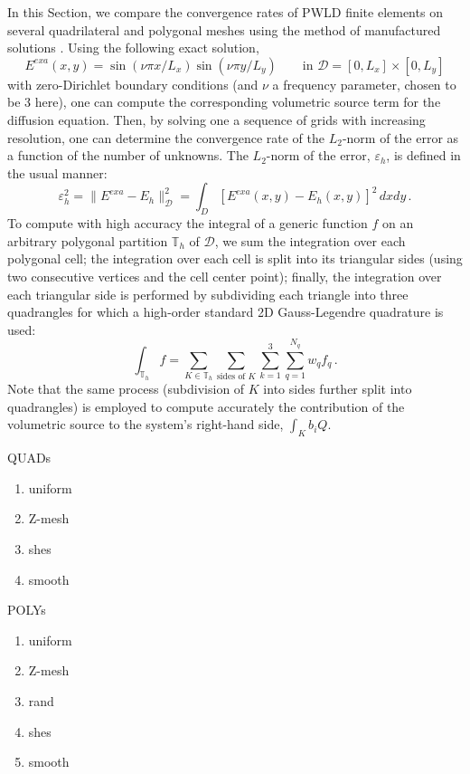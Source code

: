 \documentclass[preprint,10pt]{elsarticle}
\newcommand{\D}{\mathcal{D}}
\newcommand{\tf}{b}
\begin{document}
In this Section, we compare the convergence rates of PWLD finite elements on several quadrilateral
and polygonal meshes using the method of manufactured solutions \cite{mms}. Using the following exact solution,
\begin{equation}
	E^{\textit{exa}}(x,y) = \sin(\nu \pi x/L_x) \sin(\nu\pi y/L_y) \qquad \text{in } \D=[0,L_x]\times [0,L_y]
\end{equation}
with zero-Dirichlet boundary conditions (and $\nu$ a frequency parameter, chosen to be 3 here), one can compute 
the corresponding volumetric source term for the diffusion equation. Then, by solving one a sequence of
grids with increasing resolution, one can determine the convergence rate of the $L_2$-norm of the error
as a function of the number of unknowns. The $L_2$-norm of the error, $\varepsilon_h$, is defined in the usual manner:
\begin{equation}
	\varepsilon_h^2 = \| E^{\textit{exa}} - E_h \|^2_\D = \int_D \left[ E^{\textit{exa}}(x,y)  - E_h(x,y) \right]^2 \, dxdy	\, .
\end{equation}
To compute with high accuracy the integral of a generic function $f$ on an arbitrary polygonal partition $\mathbb{T}_h$ of $\D$, we sum the integration over each polygonal cell; the integration over each cell is split into its triangular sides (using two consecutive vertices and the cell center point); finally, the integration over each triangular side is performed by subdividing each triangle into three quadrangles for which a high-order standard 2D Gauss-Legendre quadrature is used:
\begin{equation}
	\int_{\mathbb{T}_h} f  = \sum_{K\in \mathbb{T}_h} \sum_{\text{sides of }K} \sum_{k=1}^3 
	\sum_{q=1}^{N_q} w_q f_q
	\, .
\end{equation}
Note that the same process (subdivision of $K$ into sides further split into quadrangles) is employed to compute accurately the contribution of the volumetric source to the system's right-hand side, $\int_K \tf_i Q$.


QUADs
\begin{enumerate}
	\item uniform
	\item Z-mesh
	\item shes
	\item smooth
\end{enumerate}

POLYs
\begin{enumerate}
	\item uniform
	\item Z-mesh
	\item rand
	\item shes
	\item smooth
\end{enumerate}
\end{document}
